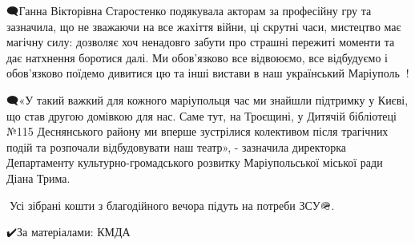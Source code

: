 🗨Ганна Вікторівна Старостенко подякувала акторам за професійну гру та
зазначила, що не зважаючи на все жахіття війни, ці скрутні часи, мистецтво має
магічну силу: дозволяє хоч ненадовго забути про страшні пережиті моменти та дає
натхнення боротися далі. Ми обов'язково все відвоюємо, все відбудуємо і
обов'язково поїдемо дивитися цю та інші вистави в наш український
Маріуполь💛💙!

🗨«У такий важкий для кожного маріупольця час ми знайшли підтримку у Києві, що
став другою домівкою для нас. Саме тут, на Троєщині, у Дитячій бібліотеці №115
Деснянського району ми вперше зустрілися колективом після трагічних подій та
розпочали відбудовувати наш театр», - зазначила директорка Департаменту
культурно-громадського розвитку Маріупольської міської ради Діана Трима.

🫶Усі зібрані кошти з благодійного вечора підуть на потреби ЗСУ🪖. 

✔️За матеріалами: КМДА
